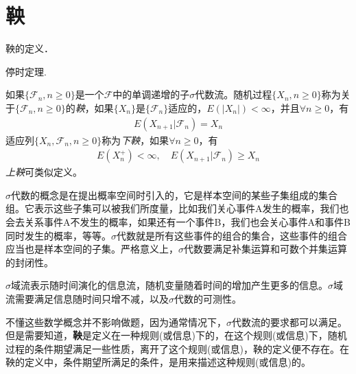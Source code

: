 
\chapter{鞅}

\begin{compactitem}
	\item 鞅的定义．
	\item 停时定理.
\end{compactitem}

\begin{definition}\label{def:martingale}
	如果\(\{\mathscr{F}_n,n\geqslant0\}\)是一个\(\mathscr{F}\)中的单调递增的子\(\sigma\)代数流。随机过程\(\{X_n,n\geqslant0\}\)称为关于\(\{\mathscr{F}_n,n\geqslant0\}\)的\emph{鞅}，如果\(\{X_n\}\)是\(\{\mathscr{F}_n\}\)适应的，\(E(\lvert X_n\rvert)<\infty\)，并且\(\forall n\geqslant0\)，有
	\begin{align*}
		E(X_{n+1}|\mathscr{F}_n)=X_n
	\end{align*}
	适应列\(\{X_n,\mathscr{F}_n,n\geqslant0\}\)称为\emph{下鞅}，如果\(\forall n \geqslant 0\)，有
	\begin{align*}
		E(X_n^+)<\infty, \quad E(X_{n+1}|\mathscr{F}_n)\geqslant X_n
	\end{align*}
	\emph{上鞅}可类似定义。
\end{definition}

\(\sigma\)代数的概念是在提出概率空间时引入的，它是样本空间的某些子集组成的集合组。它表示这些子集可以被我们所度量，比如我们关心事件A发生的概率，我们也会去关系事件A不发生的概率，如果还有一个事件B，我们也会关心事件A和事件B同时发生的概率，等等。\(\sigma\)代数就是所有这些事件的组合的集合，这些事件的组合应当也是样本空间的子集。严格意义上，\(\sigma\)代数要满足补集运算和可数个并集运算的封闭性。

\(\sigma\)域流表示随时间演化的信息流，随机变量随着时间的增加产生更多的信息。\(\sigma\)域流需要满足信息随时间只增不减，以及\(\sigma\)代数的可测性。

不懂这些数学概念并不影响做题，因为通常情况下，\(\sigma\)代数流的要求都可以满足。但是需要知道，\textbf{鞅}是定义在一种规则(或信息)下的，在这个规则(或信息)下，随机过程的条件期望满足一些性质，离开了这个规则(或信息)，鞅的定义便不存在。在鞅的定义中，条件期望所满足的条件，是用来描述这种规则(或信息)的。

